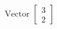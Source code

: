 \documentclass[preview]{standalone}
\begin{document}
\begin{align*}
\text{Vector } \begin{bmatrix} 3 \\ 2 \end{bmatrix}
\end{align*}
\end{document}
